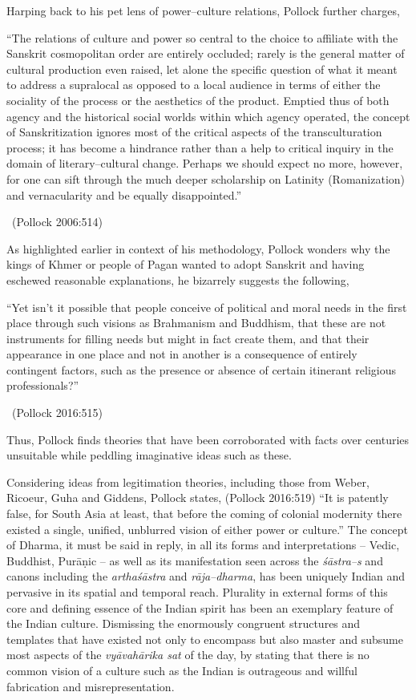 Harping back to his pet lens of power–culture relations, Pollock further charges,

\begin{myquote}
“The relations of culture and power so central to the choice to affiliate with the Sanskrit cosmopolitan order are entirely occluded; rarely is the general matter of cultural production even raised, let alone the specific question of what it meant to address a supralocal as opposed to a local audience in terms of either the sociality of the process or the aesthetics of the product. Emptied thus of both agency and the historical social worlds within which agency operated, the concept of Sanskritization ignores most of the critical aspects of the transculturation process; it has become a hindrance rather than a help to critical inquiry in the domain of literary–cultural change. Perhaps we should expect no more, however, for one can sift through the much deeper scholarship on Latinity (Romanization) and vernacularity and be equally disappointed.” 

~\hfill (Pollock 2006:514)
\end{myquote}

As highlighted earlier in context of his methodology, Pollock wonders why the kings of Khmer or people of Pagan wanted to adopt Sanskrit and having eschewed reasonable explanations, he bizarrely suggests the following,

\begin{myquote}
“Yet isn’t it possible that people conceive of political and moral needs in the first place through such visions as Brahmanism and Buddhism, that these are not instruments for filling needs but might in fact create them, and that their appearance in one place and not in another is a consequence of entirely contingent factors, such as the presence or absence of certain itinerant religious professionals?” 

~\hfill (Pollock 2016:515)
\end{myquote}

Thus, Pollock finds theories that have been corroborated with facts over centuries unsuitable while peddling imaginative ideas such as these.

Considering ideas from legitimation theories, including those from Weber, Ricoeur, Guha and Giddens, Pollock states, (Pollock 2016:519) “It is patently false, for South Asia at least, that before the coming of colonial modernity there existed a single, unified, unblurred vision of either power or culture.” The concept of Dharma, it must be said in reply, in all its forms and interpretations – Vedic, Buddhist, Purāṇic – as well as its manifestation seen across the \textit{śāstra–s} and canons including the \textit{arthaśāstra} and \textit{rāja–dharma}, has been uniquely Indian and pervasive in its spatial and temporal reach. Plurality in external forms of this core and defining essence of the Indian spirit has been an exemplary feature of the Indian culture. Dismissing the enormously congruent structures and templates that have existed not only to encompass but also master and subsume most aspects of the \textit{vyāvahārika sat} of the day, by stating that there is no common vision of a culture such as the Indian is outrageous and willful fabrication and misrepresentation.

